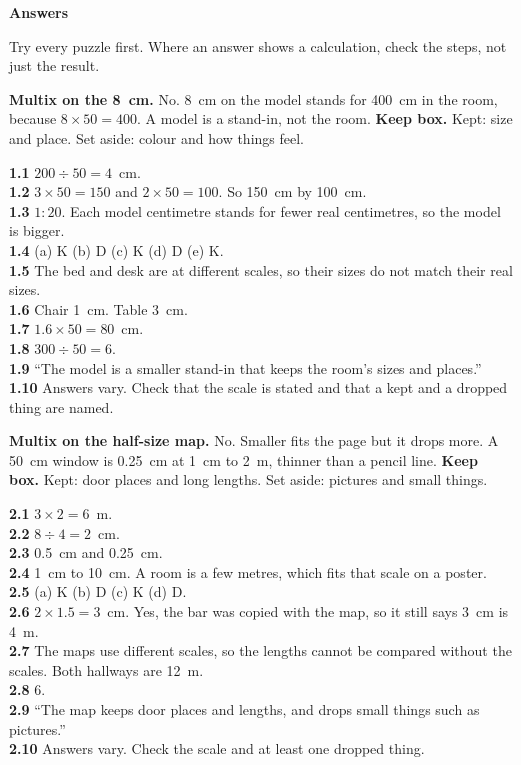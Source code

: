 \clearpage\label{answers}
{\sans\bfseries\LARGE\color{ink} Answers}\par
\footnotesize\linespread{0.94}\selectfont
Try every puzzle first. Where an answer shows a calculation, check the steps, not just the result.

\textbf{Multix on the 8~cm.} No. 8~cm on the model stands for 400~cm in the room, because $8\times50=400$. A model is a stand-in, not the room. \textbf{Keep box.} Kept: size and place. Set aside: colour and how things feel.

\textbf{1.1} $200\div50=4$~cm.\\
\textbf{1.2} $3\times50=150$ and $2\times50=100$. So 150~cm by 100~cm.\\
\textbf{1.3} $1:20$. Each model centimetre stands for fewer real centimetres, so the model is bigger.\\
\textbf{1.4} (a) K (b) D (c) K (d) D (e) K.\\
\textbf{1.5} The bed and desk are at different scales, so their sizes do not match their real sizes.\\
\textbf{1.6} Chair 1~cm. Table 3~cm.\\
\textbf{1.7} $1.6\times50=80$~cm.\\
\textbf{1.8} $300\div50=6$.\\
\textbf{1.9} ``The model is a smaller stand-in that keeps the room's sizes and places.''\\
\textbf{1.10} Answers vary. Check that the scale is stated and that a kept and a dropped thing are named.

\textbf{Multix on the half-size map.} No. Smaller fits the page but it drops more. A 50~cm window is 0.25~cm at 1~cm to 2~m, thinner than a pencil line. \textbf{Keep box.} Kept: door places and long lengths. Set aside: pictures and small things.

\textbf{2.1} $3\times2=6$~m.\\
\textbf{2.2} $8\div4=2$~cm.\\
\textbf{2.3} 0.5~cm and 0.25~cm.\\
\textbf{2.4} 1~cm to 10~cm. A room is a few metres, which fits that scale on a poster.\\
\textbf{2.5} (a) K (b) D (c) K (d) D.\\
\textbf{2.6} $2\times1.5=3$~cm. Yes, the bar was copied with the map, so it still says 3~cm is 4~m.\\
\textbf{2.7} The maps use different scales, so the lengths cannot be compared without the scales. Both hallways are 12~m.\\
\textbf{2.8} 6.\\
\textbf{2.9} ``The map keeps door places and lengths, and drops small things such as pictures.''\\
\textbf{2.10} Answers vary. Check the scale and at least one dropped thing.

